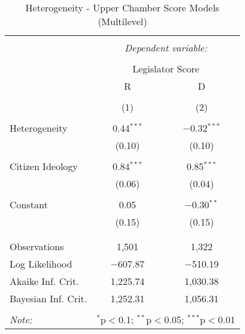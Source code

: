 
\begin{table}[!htbp] \centering 
  \caption{Heterogeneity - Upper Chamber Score Models (Multilevel)} 
  \label{div.het.mlm.models.s} 
\begin{tabular}{@{\extracolsep{5pt}}lcc} 
\\[-1.8ex]\hline 
\hline \\[-1.8ex] 
 & \multicolumn{2}{c}{\textit{Dependent variable:}} \\ 
\cline{2-3} 
\\[-1.8ex] & \multicolumn{2}{c}{Legislator Score} \\ 
 & R & D \\ 
\\[-1.8ex] & (1) & (2)\\ 
\hline \\[-1.8ex] 
 Heterogeneity & 0.44$^{***}$ & $-$0.32$^{***}$ \\ 
  & (0.10) & (0.10) \\ 
  & & \\ 
 Citizen Ideology & 0.84$^{***}$ & 0.85$^{***}$ \\ 
  & (0.06) & (0.04) \\ 
  & & \\ 
 Constant & 0.05 & $-$0.30$^{**}$ \\ 
  & (0.15) & (0.15) \\ 
  & & \\ 
\hline \\[-1.8ex] 
Observations & 1,501 & 1,322 \\ 
Log Likelihood & $-$607.87 & $-$510.19 \\ 
Akaike Inf. Crit. & 1,225.74 & 1,030.38 \\ 
Bayesian Inf. Crit. & 1,252.31 & 1,056.31 \\ 
\hline 
\hline \\[-1.8ex] 
\textit{Note:}  & \multicolumn{2}{r}{$^{*}$p$<$0.1; $^{**}$p$<$0.05; $^{***}$p$<$0.01} \\ 
\end{tabular} 
\end{table} 
